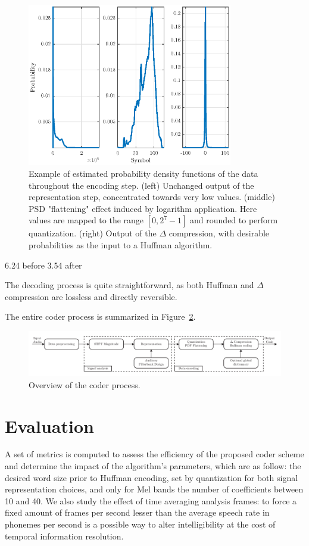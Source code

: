 \documentclass[final,3p,times,twocolumn]{elsarticle}
\begin{document}
\begin{figure}[htbp]
	\centering
		\includegraphics[width=0.8\textwidth]{pdf.eps}
	\caption{Example of estimated probability density functions of the data throughout the encoding step. (left) Unchanged output of the representation step, concentrated towards very low values. (middle) PSD "flattening" effect induced by logarithm application. Here values are mapped to the range $[0, 2^7-1]$ and rounded to perform quantization. (right) Output of the $\Delta$ compression, with desirable probabilities as the input to a Huffman algorithm.}
	\label{fig:pdf}
\end{figure}
6.24 before
3.54 after

The decoding process is quite straightforward, as both Huffman and $\Delta$ compression are lossless and directly reversible.


The entire coder process is summarized in Figure~\ref{fig:scheme}.

\begin{figure}[htbp]
	\centering
		\includegraphics[width=1\textwidth]{scheme.pdf}
	\caption{Overview of the coder process.}
	\label{fig:scheme}
\end{figure}

\section{Evaluation}
A set of metrics is computed to assess the efficiency of the proposed coder scheme and determine the impact of the algorithm's parameters, which are as follow: the desired word size prior to Huffman encoding, set by quantization for both signal representation choices, and only for Mel bands the number of coefficients between 10 and 40. We also study the effect of time averaging analysis frames: to force a fixed amount of frames per second lesser than the average speech rate in phonemes per second is a possible way to alter intelligibility at the cost of temporal information resolution.\\
\end{document}
